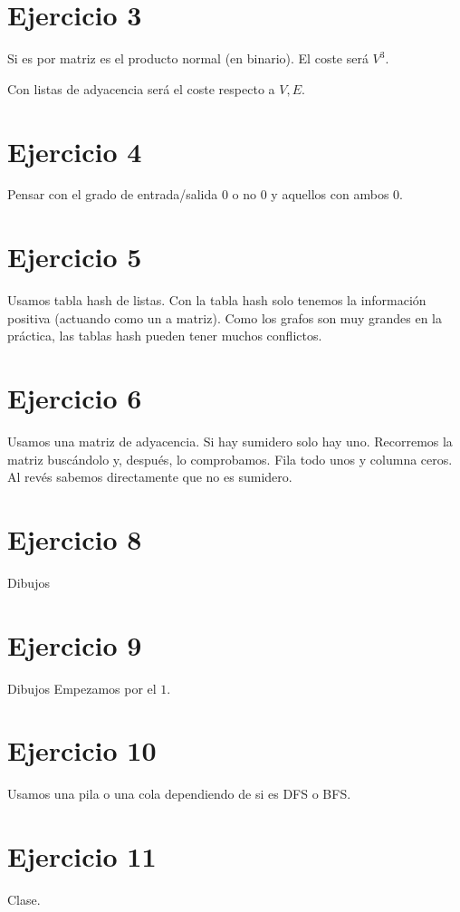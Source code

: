 \documentclass[10pt,a4paper,openright]{book}
\theoremstyle{break}
\begin{document}
\section{Ejercicio 3}%
\label{sec:ejercicio_3_4}
Si es por matriz es el producto normal (en binario). El coste será $V^3$.

Con listas de adyacencia será el coste respecto a $V, E$.

\section{Ejercicio 4}%
\label{sec:ejercicio_4_4}
Pensar con el grado de entrada/salida $0$ o no $0$ y aquellos con ambos $0$.

\section{Ejercicio 5}%
\label{sec:ejercicio_5_4}
Usamos tabla hash de listas. Con la tabla hash solo tenemos la información positiva (actuando como un a matriz). Como los grafos son muy grandes en la práctica, las tablas hash pueden tener muchos conflictos.

\section{Ejercicio 6}%
\label{sec:ejercicio_6_4}
Usamos una matriz de adyacencia. 
Si hay sumidero solo hay uno. Recorremos la matriz buscándolo y, después, lo comprobamos.
Fila todo unos y columna ceros. Al revés sabemos directamente que no es sumidero.

\section{Ejercicio 8}%
\label{sec:ejercicio_8_4}
Dibujos

\section{Ejercicio 9}%
\label{sec:ejercicio_9_4}
Dibujos
Empezamos por el $1$.

\section{Ejercicio 10}%
\label{sec:ejercicio_10_4}
Usamos una pila o una cola dependiendo de si es DFS o BFS.


\section{Ejercicio 11}%
\label{sec:ejercicio_11_4}
Clase.
\end{document}
